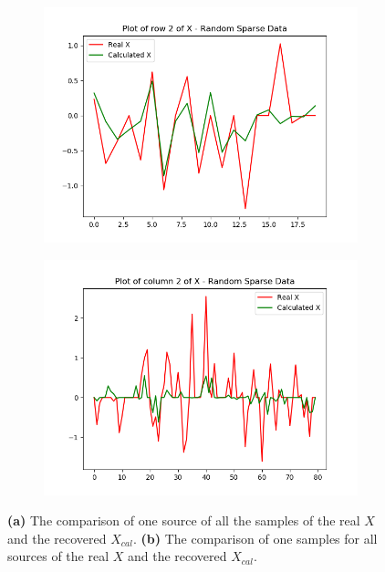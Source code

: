 \begin{figure}[H]
\centering
\begin{subfigure}{0.49\textwidth}
\centering
\includegraphics[width=\textwidth]{figures/cases/case1_1.png}
\caption{}
\label{fig:case1_1}
\end{subfigure}
\begin{subfigure}{0.49\textwidth}
\includegraphics[width=\textwidth]{figures/cases/case1_2.png}
\caption{}
\label{fig:case1_2}
\end{subfigure}
\caption{\textbf{(a)} The comparison of one source of all the samples of the real $X$ and the recovered $X_{cal}$. \textbf{(b)} The comparison of one samples for all sources of the real $X$ and the recovered $X_{cal}$.}
\end{figure}
